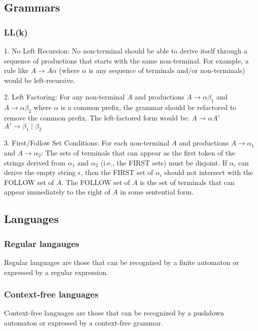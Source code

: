 \subsection{Grammars}

\subsubsection{LL(k)}

1. No Left Recursion: No non-terminal should be able to derive itself through a sequence of productions that starts with the same non-terminal. For example, a rule like $A \rightarrow A\alpha$ (where $\alpha$  is any sequence of terminals and/or non-terminals) would be left-recursive.

2. Left Factoring: For any non-terminal $A$ and productions $A \rightarrow \alpha \beta_1$ and $A \rightarrow \alpha \beta_2$ where $\alpha$ is a common prefix, the grammar should be refactored to remove the common prefix. The left-factored form would be:
   $A \rightarrow \alpha A'$\\
   $A' \rightarrow \beta_1 \mid \beta_2$

3. First/Follow Set Conditions: For each non-terminal $A$ and productions $A \rightarrow \alpha_1$ and $A \rightarrow \alpha_2$:
   The sets of terminals that can appear as the first token of the strings derived from $\alpha_1$ and $\alpha_2$ (i.e., the FIRST sets) must be disjoint.
   If $\alpha_i$ can derive the empty string $\epsilon$, then the FIRST set of $\alpha_i$ should not intersect with the FOLLOW set of $A$. The FOLLOW set of $A$ is the set of terminals that can appear immediately to the right of $A$ in some sentential form.






\subsection{Languages}

\subsubsection{Regular langauges}
Regular languages are those that can be recognized by a finite automaton or expressed by a regular expression.

\subsubsection{Context-free languages}
Context-free languages are those that can be recognized by a pushdown automaton or expressed by a context-free grammar.